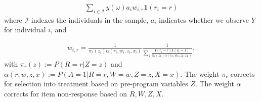\begin{appendices}
\begin{align*}
\sum_{i \in \mathcal{I}} y(\omega) a_{i} w_{i,r} \mathbf{1}(r_i = r)
\end{align*}
\noindent where $\mathcal{I}$ indexes the individuals in the sample, $a_i$ indicates whether we observe $Y$ for individual $i$, and

\begin{align*}
	w_{i,r} = \frac{1}{\pi_r(z_i) \alpha(r_i,w_i,z_i,x_i)} \frac{1}{\sum_k{\frac{\mathbf{1}(r_i = r) \mathbf{1}(a_i = 1)}{\pi_r(z_k)\alpha(r_k,w_k,z_k,x_k)}}},
\end{align*}
\noindent with $\pi_r(z) := P(R=r|Z=z)$ and $\alpha(r,w,z,x) := P(A=1|R=r,W=w,Z=z,X=x)$. The weight $\pi_r$ corrects for selection into treatment based on pre-program variables $Z$. The weight $\alpha$ corrects for item non-response based on $R, W, Z, X$. \\


\setcounter{figure}{0}  \renewcommand{\thefigure}{H.\arabic{figure}}
\setcounter{table}{0}   \renewcommand{\thetable}{H.\arabic{table}}


\setcounter{figure}{0}  \renewcommand{\thefigure}{I.\arabic{figure}}
\setcounter{table}{0}   \renewcommand{\thetable}{I.\arabic{table}}


\setcounter{figure}{0}  \renewcommand{\thefigure}{J.\arabic{figure}}
\setcounter{table}{0}   \renewcommand{\thetable}{J.\arabic{table}}


\setcounter{figure}{0}  \renewcommand{\thefigure}{K.\arabic{figure}}
\setcounter{table}{0}   \renewcommand{\thetable}{K.\arabic{table}}


\setcounter{figure}{0}  \renewcommand{\thefigure}{L.\arabic{figure}} %
\setcounter{table}{0}   \renewcommand{\thetable}{L.\arabic{table}}


\setcounter{figure}{0}  \renewcommand{\thefigure}{N.\arabic{figure}}
\setcounter{table}{0}   \renewcommand{\thetable}{N.\arabic{table}}


\setcounter{figure}{0}  \renewcommand{\thefigure}{O.\arabic{figure}}
\setcounter{table}{0}   \renewcommand{\thetable}{O.\arabic{table}}


\setcounter{figure}{0}  \renewcommand{\thefigure}{P.\arabic{figure}}
\setcounter{table}{0}   \renewcommand{\thetable}{P.\arabic{table}}


\setcounter{figure}{0}  \renewcommand{\thefigure}{Q.\arabic{figure}}
\setcounter{table}{0}   \renewcommand{\thetable}{Q.\arabic{table}}


\end{appendices}

\renewcommand{\refname}{Appendix References}
\clearpage
\singlespace



 